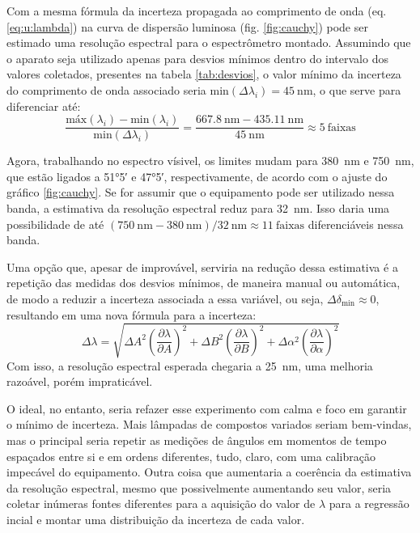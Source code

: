 Com a mesma fórmula da incerteza propagada ao comprimento de onda (eq. \ref{eq:u:lambda}) na curva de dispersão luminosa (fig. \ref{fig:cauchy}) pode ser estimado uma resolução espectral para o espectrômetro montado. Assumindo que o aparato seja utilizado apenas para desvios mínimos dentro do intervalo dos valores coletados, presentes na tabela \ref{tab:desvios}, o valor mínimo da incerteza do comprimento de onda associado seria $\text{min}(\Delta\lambda_i) = \SI{45}{\nano\meter}$, o que serve para diferenciar até:
\[
    \frac{\text{máx}(\lambda_i)-\text{min}(\lambda_i)}{\text{min}(\Delta\lambda_i)} = \frac{\SI{667.8}{\nano\meter}-\SI{435.11}{\nano\meter}}{\SI{45}{\nano\meter}} \approx 5~\text{faixas}
\]

Agora, trabalhando no espectro vísivel, os limites mudam para \SI{380}{\nano\meter} e \SI{750}{\nano\meter}, que estão ligados a \ang{51;5;} e \ang{47;5;}, respectivamente, de acordo com o ajuste do gráfico \ref{fig:cauchy}. Se for assumir que o equipamento pode ser utilizado nessa banda, a estimativa da resolução espectral reduz para \SI{32}{\nano\meter}. Isso daria uma possibilidade de até $(\SI{750}{\nano\meter}-\SI{380}{\nano\meter})/\SI{32}{\nano\meter} \approx 11~\text{faixas}$ diferenciáveis nessa banda.

Uma opção que, apesar de improvável, serviria na redução dessa estimativa é a repetição das medidas dos desvios mínimos, de maneira manual ou automática, de modo a reduzir a incerteza associada a essa variável, ou seja, $\Delta\delta_\text{min} \approx 0$, resultando em uma nova fórmula para a incerteza:
\begin{equation}
    \Delta\lambda = \sqrt{
        \Delta{A}^2 \left(\frac{\partial\lambda}{\partial A}\right)^2
        + \Delta{B}^2 \left(\frac{\partial\lambda}{\partial B}\right)^2
        + \Delta{\alpha}^2 \left(\frac{\partial\lambda}{\partial\alpha}\right)^2
    }
\end{equation}
Com isso, a resolução espectral esperada chegaria a \SI{25}{\nano\meter}, uma melhoria razoável, porém impraticável.

O ideal, no entanto, seria refazer esse experimento com calma e foco em garantir o mínimo de incerteza. Mais lâmpadas de compostos variados seriam bem-vindas, mas o principal seria repetir as medições de ângulos em momentos de tempo espaçados entre si e em ordens diferentes, tudo, claro, com uma calibração impecável do equipamento. Outra coisa que aumentaria a coerência da estimativa da resolução espectral, mesmo que possivelmente aumentando seu valor, seria coletar inúmeras fontes diferentes para a aquisição do valor de $\lambda$ para a regressão incial e montar uma distribuição da incerteza de cada valor.
